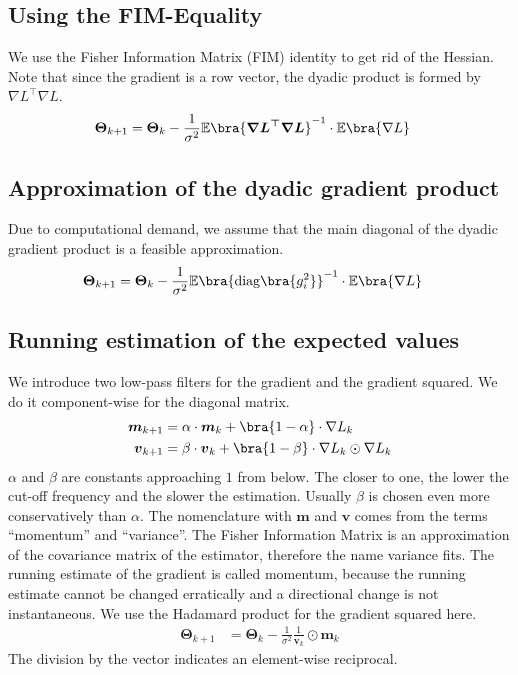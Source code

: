 \subsection*{Using the FIM-Equality}
We use the Fisher Information Matrix (FIM) identity to get rid of the Hessian. Note that since the gradient is a row vector, the dyadic product is formed by $\nabla L^\top \nabla L$.
\begin{align}
	\boldsymbol{\Theta}_{k+1}&=\boldsymbol{\Theta}_{k} - \frac{1}{\sigma^2}\mathbb{E}\bra{\boldsymbol{\nabla L^\top\nabla L}}^{-1}\cdot\mathbb{E}\bra{\nabla L}
\end{align}

\subsection*{Approximation of the dyadic gradient product}
Due to computational demand, we assume that the main diagonal of the dyadic gradient product is a feasible approximation.
\begin{align}
	\boldsymbol{\Theta}_{k+1}&=\boldsymbol{\Theta}_{k} - \frac{1}{\sigma^2}\mathbb{E}\bra{\mathrm{diag}\bra{g_i^2}}^{-1}\cdot\mathbb{E}\bra{\nabla L}
\end{align}

\subsection*{Running estimation of the expected values}
We introduce two low-pass filters for the gradient and the gradient squared. We do it component-wise for the diagonal matrix.
\begin{align}
	\boldsymbol{m}_{k+1}&=\alpha\cdot \boldsymbol{m}_{k} + \bra{1-\alpha}\cdot \nabla L_k\\
	\boldsymbol{v}_{k+1}&=\beta\cdot \boldsymbol{v}_{k} + \bra{1-\beta}\cdot \nabla L_k\odot\nabla L_k
\end{align}
$\alpha$ and $\beta$ are constants approaching $1$ from below. The closer to one, the lower the cut-off frequency and the slower the estimation. Usually $\beta$ is chosen even more conservatively than $\alpha$. The nomenclature with $\boldsymbol{m}$ and $\boldsymbol{v}$ comes from the terms \enquote{momentum} and \enquote{variance}. The Fisher Information Matrix is an approximation of the covariance matrix of the estimator, therefore the name variance fits. The running estimate of the gradient is called momentum, because the running estimate cannot be changed erratically and a directional change is not instantaneous. We use the Hadamard product for the gradient squared here.
\begin{align}
	\boldsymbol{\Theta}_{k+1}&=\boldsymbol{\Theta}_{k} - \frac{1}{\sigma^2}\frac{1}{\boldsymbol{v}_k}\odot\boldsymbol{m}_k
\end{align}
The division by the vector indicates an element-wise reciprocal.

